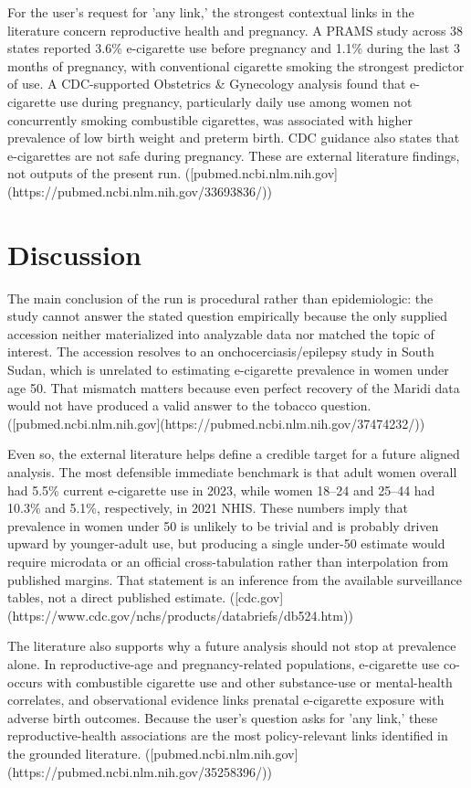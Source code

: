 \documentclass[11pt]{article}
\begin{document}
For the user's request for 'any link,' the strongest contextual links in the literature concern reproductive health and pregnancy. A PRAMS study across 38 states reported 3.6\% e-cigarette use before pregnancy and 1.1\% during the last 3 months of pregnancy, with conventional cigarette smoking the strongest predictor of use. A CDC-supported Obstetrics \& Gynecology analysis found that e-cigarette use during pregnancy, particularly daily use among women not concurrently smoking combustible cigarettes, was associated with higher prevalence of low birth weight and preterm birth. CDC guidance also states that e-cigarettes are not safe during pregnancy. These are external literature findings, not outputs of the present run. ([pubmed.ncbi.nlm.nih.gov](https://pubmed.ncbi.nlm.nih.gov/33693836/))

\section{Discussion}
The main conclusion of the run is procedural rather than epidemiologic: the study cannot answer the stated question empirically because the only supplied accession neither materialized into analyzable data nor matched the topic of interest. The accession resolves to an onchocerciasis/epilepsy study in South Sudan, which is unrelated to estimating e-cigarette prevalence in women under age 50. That mismatch matters because even perfect recovery of the Maridi data would not have produced a valid answer to the tobacco question. ([pubmed.ncbi.nlm.nih.gov](https://pubmed.ncbi.nlm.nih.gov/37474232/))

Even so, the external literature helps define a credible target for a future aligned analysis. The most defensible immediate benchmark is that adult women overall had 5.5\% current e-cigarette use in 2023, while women 18–24 and 25–44 had 10.3\% and 5.1\%, respectively, in 2021 NHIS. These numbers imply that prevalence in women under 50 is unlikely to be trivial and is probably driven upward by younger-adult use, but producing a single under-50 estimate would require microdata or an official cross-tabulation rather than interpolation from published margins. That statement is an inference from the available surveillance tables, not a direct published estimate. ([cdc.gov](https://www.cdc.gov/nchs/products/databriefs/db524.htm))

The literature also supports why a future analysis should not stop at prevalence alone. In reproductive-age and pregnancy-related populations, e-cigarette use co-occurs with combustible cigarette use and other substance-use or mental-health correlates, and observational evidence links prenatal e-cigarette exposure with adverse birth outcomes. Because the user's question asks for 'any link,' these reproductive-health associations are the most policy-relevant links identified in the grounded literature. ([pubmed.ncbi.nlm.nih.gov](https://pubmed.ncbi.nlm.nih.gov/35258396/))
\end{document}
